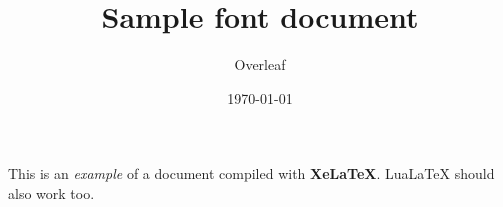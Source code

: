 \documentclass[12pt]{article}
\title{Sample font document}
\author{Overleaf}
\date{\today}
\begin{document}
\maketitle
     
This is an \textit{example} of a document compiled 
with \textbf{XeLaTeX}. LuaLaTeX should also work too.
\end{document}
